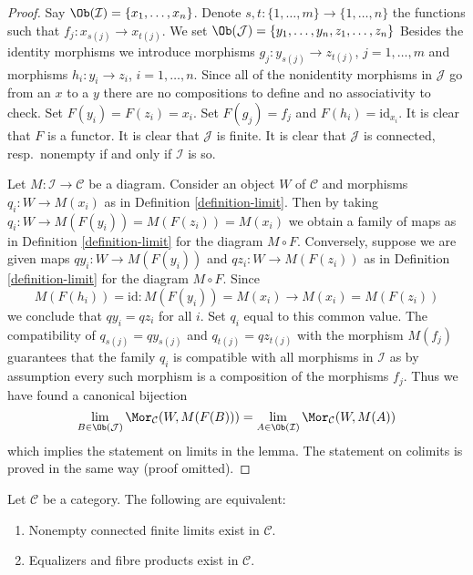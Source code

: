 \begin{proof}
Say $\Ob(\mathcal{I}) = \{x_1, \ldots, x_n\}$.
Denote $s, t : \{1, \ldots, m\} \to \{1, \ldots, n\}$ the functions
such that $f_j : x_{s(j)} \to x_{t(j)}$.
We set $\Ob(\mathcal{J}) = \{y_1, \ldots, y_n, z_1, \ldots, z_n\}$
Besides the identity morphisms we introduce morphisms
$g_j : y_{s(j)} \to z_{t(j)}$, $j = 1, \ldots, m$ and morphisms
$h_i : y_i \to z_i$, $i = 1, \ldots, n$. Since all of the nonidentity
morphisms in $\mathcal{J}$ go from an $x$ to a $y$ there are no
compositions to define and no associativity to check.
Set $F(y_i) = F(z_i) = x_i$. Set $F(g_j) = f_j$ and $F(h_i) = \text{id}_{x_i}$.
It is clear that $F$ is a functor.
It is clear that $\mathcal{J}$ is finite.
It is clear that $\mathcal{J}$ is connected, resp.\ nonempty
if and only if $\mathcal{I}$ is so.

\medskip\noindent
Let $M : \mathcal{I} \to \mathcal{C}$ be a diagram.
Consider an object $W$ of $\mathcal{C}$ and morphisms
$q_i : W \to M(x_i)$ as in
Definition \ref{definition-limit}.
Then by taking $q_i : W \to M(F(y_i)) = M(F(z_i)) = M(x_i)$ we obtain
a family of maps as in
Definition \ref{definition-limit}
for the diagram $M \circ F$.
Conversely, suppose we are given maps
$qy_i : W \to M(F(y_i))$ and $qz_i : W \to M(F(z_i))$
as in
Definition \ref{definition-limit}
for the diagram $M \circ F$. Since
$$
M(F(h_i)) = \text{id} : M(F(y_i)) = M(x_i) \longrightarrow M(x_i) = M(F(z_i))
$$
we conclude that $qy_i = qz_i$ for all $i$. Set $q_i$ equal to this common
value. The compatibility of
$q_{s(j)} = qy_{s(j)}$ and $q_{t(j)} = qz_{t(j)}$ with the morphism
$M(f_j)$ guarantees that the family $q_i$ is compatible with all morphisms
in $\mathcal{I}$ as by assumption every such morphism is a composition
of the morphisms $f_j$. Thus we have found a canonical bijection
$$
\lim_{B \in \Ob(\mathcal{J})} \Mor_\mathcal{C}(W, M(F(B)))
=
\lim_{A \in \Ob(\mathcal{I})} \Mor_\mathcal{C}(W, M(A))
$$
which implies the statement on limits in the lemma. The statement on colimits
is proved in the same way (proof omitted).
\end{proof}

\begin{lemma}
\label{lemma-fibre-products-equalizers-exist}
Let $\mathcal{C}$ be a category.
The following are equivalent:
\begin{enumerate}
\item Nonempty connected finite limits exist in $\mathcal{C}$.
\item Equalizers and fibre products exist in $\mathcal{C}$.
\end{enumerate}
\end{lemma}

